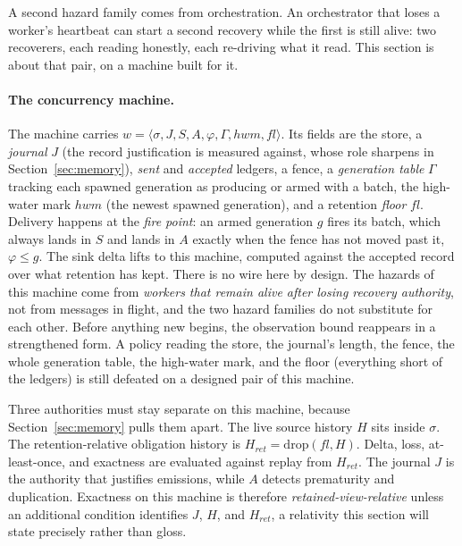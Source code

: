 \documentclass[sigplan,10pt]{acmart}
\theoremstyle{plain}
\theoremstyle{definition}
\begin{document}
A second hazard family comes from orchestration. An orchestrator that
loses a worker's heartbeat can start a second recovery while the first
is still alive: two recoverers, each reading honestly, each re-driving
what it read. This section is about that pair, on a machine built for
it.

\paragraph{The concurrency machine.}
The machine carries
$w = \langle \sigma, J, S, A, \varphi, \Gamma, \mathit{hwm},
\mathit{fl} \rangle$. Its fields are the store, a \emph{journal} $J$ (the record
justification is measured against, whose role sharpens in
Section~\ref{sec:memory}), \emph{sent} and \emph{accepted} ledgers, a
fence, a \emph{generation table} $\Gamma$ tracking each spawned
generation as producing or armed with a batch, the high-water mark
$\mathit{hwm}$ (the newest spawned generation), and a retention
\emph{floor} $\mathit{fl}$. Delivery happens at the \emph{fire point}:
an armed generation $g$ fires its batch, which always lands in $S$ and
lands in $A$ exactly when the fence has not moved past it,
$\varphi \le g$. The sink delta lifts to this machine, computed against
the accepted record over what retention has kept. There is no wire
here by design. The hazards of this machine come from \emph{workers that remain alive
after losing recovery authority}, not from messages in flight, and the two
hazard families do not substitute for each other. Before anything new
begins, the observation bound reappears in a strengthened form. A policy
reading the store, the journal's length, the fence, the whole
generation table, the high-water mark, and the floor (everything short
of the ledgers) is still defeated on a designed pair of this machine.

Three authorities must stay separate on this machine, because
Section~\ref{sec:memory} pulls them apart. The live source history $H$
sits inside $\sigma$. The retention-relative obligation history is
$H_{\mathit{ret}}=\mathrm{drop}(\mathit{fl},H)$. Delta, loss,
at-least-once, and exactness are evaluated against replay from
$H_{\mathit{ret}}$. The journal $J$ is the authority that justifies
emissions, while $A$ detects prematurity and duplication. Exactness on
this machine is therefore \emph{retained-view-relative} unless an additional
condition identifies $J$, $H$, and $H_{\mathit{ret}}$, a relativity this
section will state precisely rather than gloss.
\end{document}

